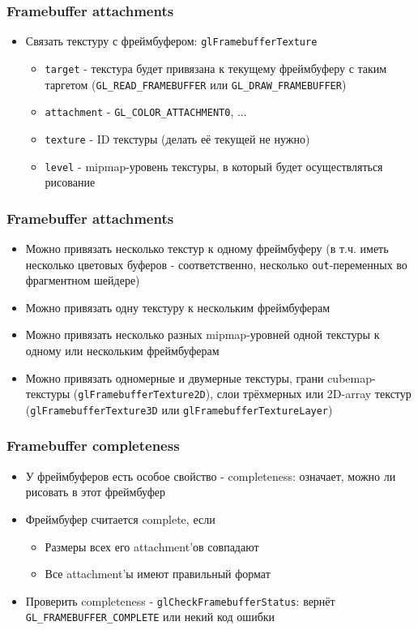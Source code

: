 \documentclass{beamer}
\begin{document}
\begin{frame}[fragile]
\frametitle{Framebuffer attachments}
\begin{itemize}
\item Связать текстуру с фреймбуфером: \verb|glFramebufferTexture|
\pause
\begin{itemize}
\item \verb|target| - текстура будет привязана к текущему фреймбуферу с таким таргетом (\verb|GL_READ_FRAMEBUFFER| или \verb|GL_DRAW_FRAMEBUFFER|)
\pause
\item \verb|attachment| - \verb|GL_COLOR_ATTACHMENT0|, ...
\pause
\item \verb|texture| - ID текстуры (делать её текущей не нужно)
\pause
\item \verb|level| - mipmap-уровень текстуры, в который будет осуществляться рисование
\end{itemize}
\end{itemize}
\end{frame}

\begin{frame}[fragile]
\frametitle{Framebuffer attachments}
\begin{itemize}
\item Можно привязать несколько текстур к одному фреймбуферу (в т.ч. иметь несколько цветовых буферов - соответственно, несколько \verb|out|-переменных во фрагментном шейдере)
\pause
\item Можно привязать одну текстуру к нескольким фреймбуферам
\pause
\item Можно привязать несколько разных mipmap-уровней одной текстуры к одному или нескольким фреймбуферам
\pause
\item Можно привязать одномерные и двумерные текстуры, грани cubemap-текстуры (\verb|glFramebufferTexture2D|), слои трёхмерных или 2D-array текстур (\verb|glFramebufferTexture3D| или \verb|glFramebufferTextureLayer|)
\end{itemize}
\end{frame}

\begin{frame}[fragile]
\frametitle{Framebuffer completeness}
\begin{itemize}
\item У фреймбуферов есть особое свойство - completeness: означает, можно ли рисовать в этот фреймбуфер
\pause
\item Фреймбуфер считается complete, если
\begin{itemize}
\item Размеры всех его attachment'ов совпадают
\pause
\item Все attachment'ы имеют правильный формат
\end{itemize}
\pause
\item Проверить completeness - \verb|glCheckFramebufferStatus|: вернёт \verb|GL_FRAMEBUFFER_COMPLETE| или некий код ошибки
\end{itemize}
\end{frame}
\end{document}
